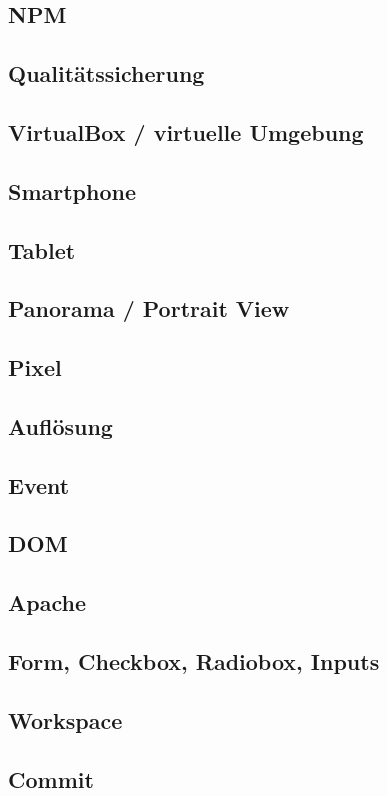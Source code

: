 		\subsection{NPM}
		\subsection{Qualitätssicherung}
		\subsection{VirtualBox / virtuelle Umgebung}
		\subsection{Smartphone}
		\subsection{Tablet}
		\subsection{Panorama / Portrait View}
		\subsection{Pixel}
		\subsection{Auflösung}
		\subsection{Event}
		\subsection{DOM}
		\subsection{Apache}
		\subsection{Form, Checkbox, Radiobox, Inputs}
		\subsection{Workspace}
		\subsection{Commit}
	
